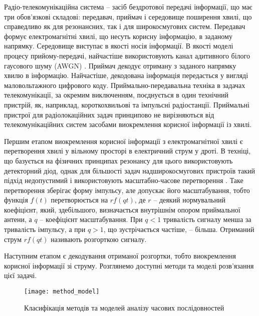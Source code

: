 Радіо-телекомунікаційна система -- засіб бездротової передачі інформації, що 
має три обов'язкові складові: передавач, приймач і середовище поширення 
хвилі, що справедливо як для резонансних, так і для широкосмугових систем. 
Передавач формує електромагнітні хвилі,  що несуть корисну інформацію, в 
заданому напрямку. Середовище виступає в якості носія інформації. В якості 
моделі процесу прийому-передачі, найчастіше використовують канал адитивного 
білого гаусового шуму (AWGN) \cite{imp:Lazorenko2009}. Приймач декодує 
отриману з заданого напрямку хвилю в інформацію. Найчастіше, декодована 
інформація передасться у вигляді маловольтажного цифрового коду. 
Приймально-передавальна техніка в задачах телекомунікації, за окремим 
виключенням, поєднується в один технічний пристрій, як, наприклад, 
короткохвильові та імпульсні радіостанції. Приймальні пристрої для 
радіолокаційних задач принципово не вирізняються від телекомунікаційних 
систем засобами виокремлення корисної інформації із хвилі.


Першим етапом виокремлення корисної інформації з електромагнітної хвилі є 
перетворення хвилі у вільному просторі в електричний струм у дроті. В техніці, 
що базується на фізичних принципах резонансу для цього використовують 
детекторний діод, однак для більшості задач надширокосмугових пристроїв 
такий підхід недопустимий і використовують масштабно-часове перетворення
\cite{imp:Lazorenko2009}. Таке перетворення зберігає форму імпульсу, але 
допускає його масштабування, тобто функція $ f(t) $ перетворюється на 
$ r f(qt) $, де $ r $ -- деякий нормувальний коефіцієнт, який, здебільшого, 
визначається внутрішнім опором приймальної антени, а $ q $ -- коефіцієнт 
масштабування. При $ q < 1 $ тривалість сигналу менша за тривалість імпульсу, 
а при $ q > 1 $, що зустрічається частіше, -- більша. Отриманий струм 
$ r f(qt) $ називають розгорткою сигналу.

Наступним етапом є декодування отриманої розгортки, тобто виокремлення корисної 
інформації зі струму. Розглянемо доступні методи та моделі розв'язання цієї 
задачі.

\begin{figure}[htbp] \begin{center}
\texttt{[image: method\_model]}
\caption{Класифікація методів та моделей аналізу часових послідовностей} 
\label{fig:method_model}
\end{center} \end{figure}

